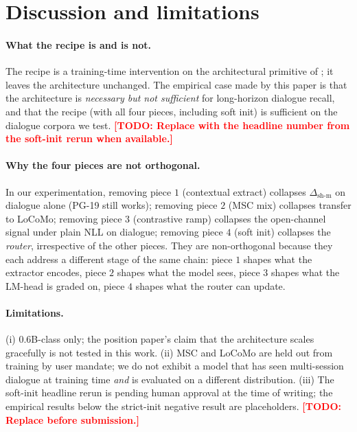 \documentclass{article}
\newcommand{\todo}[1]{\textcolor{red}{\textbf{[TODO: #1]}}}
\newcommand{\dsh}{\Delta_{\text{sh-m}}}
\begin{document}
\section{Discussion and limitations}
\label{sec:discussion}

\paragraph{What the recipe is and is not.} The recipe is a
training-time intervention on the architectural primitive of
\cite{liu2025drop}; it leaves the architecture unchanged. The
empirical case made by this paper is that the architecture is
\emph{necessary but not sufficient} for long-horizon dialogue
recall, and that the recipe (with all four pieces, including soft
init) is sufficient on the dialogue corpora we test.
\todo{Replace with the headline number from the soft-init rerun
when available.}

\paragraph{Why the four pieces are not orthogonal.} In our
experimentation, removing piece $1$ (contextual extract) collapses
$\dsh$ on dialogue alone (PG-19 still works); removing piece $2$
(MSC mix) collapses transfer to LoCoMo; removing piece $3$
(contrastive ramp) collapses the open-channel signal under plain
NLL on dialogue; removing piece $4$ (soft init) collapses the
\emph{router}, irrespective of the other pieces. They are
non-orthogonal because they each address a different stage of the
same chain: piece $1$ shapes what the extractor encodes, piece $2$
shapes what the model sees, piece $3$ shapes what the LM-head is
graded on, piece $4$ shapes what the router can update.

\paragraph{Limitations.}
(i) $0.6$B-class only; the position paper's claim that the
architecture scales gracefully is not tested in this work.
(ii) MSC and LoCoMo are held out from training by user mandate; we
do not exhibit a model that has seen multi-session dialogue at
training time \emph{and} is evaluated on a different distribution.
(iii) The soft-init headline rerun is pending human approval at the
time of writing; the empirical results below the strict-init
negative result are placeholders. \todo{Replace before submission.}
\end{document}
